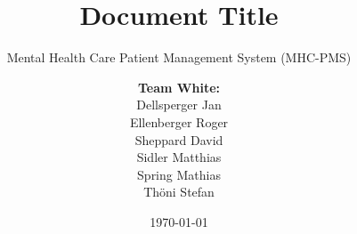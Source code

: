 \documentclass[a4paper]{scrreprt}
\title{Document Title}
\subtitle{Mental Health Care Patient Management System (MHC-PMS)}
\author{
\begin{tabular}{l}
\normalfont\bfseries{Team White:}\\
Dellsperger Jan\\
Ellenberger Roger\\
Sheppard David\\
Sidler Matthias\\
Spring Mathias\\
Thöni Stefan
\end{tabular}
}
\date{\today}
\begin{document}
\begin{titlepage}
	\maketitle
\end{titlepage}
\end{document}
